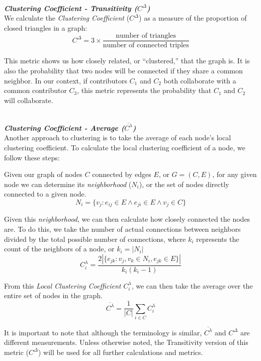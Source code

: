 \documentclass{proc}
\begin{document}
\noindent\\\textit{\textbf{Clustering Coefficient - Transitivity ($C^\Delta$)}}\\
We calculate the \textit{Clustering Coefficient} ($C^\Delta$) as a measure of the proportion of closed triangles in a graph\cite{newman2003structure}:
\[C^\Delta = 3 \times \frac{\text{number of triangles}}
                    {\text{number of connected triples}}\]

This metric shows us how closely related, or ``clustered,'' that the graph is. It is also the probability that two nodes will be connected if they share a common neighbor\cite{newman2003properties}. In our context, if contributors $C_1$ and $C_2$ both collaborate with a common contributor $C_3$, this metric represents the probability that $C_1$ and $C_2$ will collaborate.

\noindent\\\textit{\textbf{Clustering Coefficient - Average ($\overline{C^{\lambda}}$)}}\\
Another approach to clustering is to take the average of each node's local clustering coefficient\cite{watts1998collective}. To calculate the local clustering coefficient of a node, we follow these steps:

Given our graph of nodes $C$ connected by edges $E$, or ${G=(C,E)}$, for any given node we can determine its \textit{neighborhood} ($N_i$), or the set of nodes directly connected to a given node.
\[ N_i = \{v_j : e_{ij} \in E \wedge e_{ji} \in E \wedge v_j \in C\} \]

Given this \textit{neighborhood}, we can then calculate how closely connected the nodes are. To do this, we take the number of actual connections between neighbors divided by the total possible number of connections, where $k_i$ represents the count of the neighbors of a node, or {$k_i = |N_i|$}
\[ C^{\lambda}_i = \frac{2|\{e_{jk}: v_j,v_k \in N_i, e_{jk} \in E\}|}{k_i(k_i-1)} \]

From this \textit{Local Clustering Coefficient} $C^{\lambda}_i$, we can then take the average over the entire set of nodes in the graph.
\[ \overline{C^\lambda} = \frac{1}{|C|}\sum_{i \in C}C^{\lambda}_i \]

It is important to note that although the terminology is similar\cite{uzzi2005collaboration}, $\overline{C^\lambda}$ and $C^\Delta$ are different measurements. Unless otherwise noted, the Transitivity version of this metric ($C^\Delta$) will be used for all further calculations and metrics.
\end{document}
